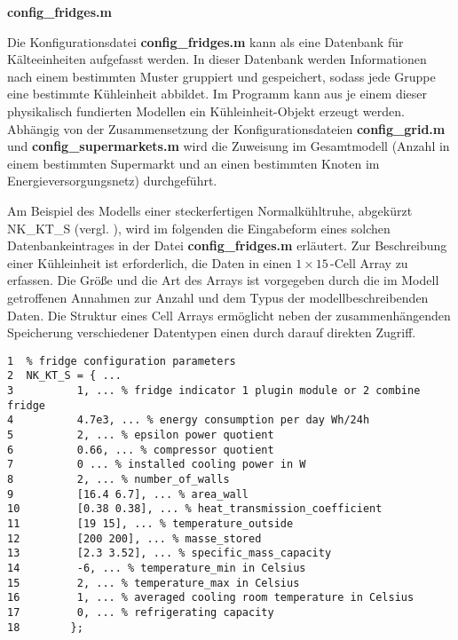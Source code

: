 \vspace{3mm}%
\noindent\textbf{config\_fridges.m}
\vspace{3mm}

Die Konfigurationsdatei \textbf{config\_fridges.m} kann als eine Datenbank für Kälteeinheiten aufgefasst werden. In dieser
Datenbank werden Informationen nach einem bestimmten Muster gruppiert und gespeichert, sodass jede Gruppe eine bestimmte
Kühleinheit abbildet. Im Programm kann aus je einem dieser physikalisch fundierten
Modellen ein Kühleinheit-Objekt erzeugt werden. Abhängig von der Zusammensetzung der
Konfigurationsdateien \textbf{config\_grid.m} und \textbf{config\_supermarkets.m} wird die Zuweisung im Gesamtmodell (Anzahl
in einem bestimmten Supermarkt und an einen bestimmten Knoten im Energieversorgungsnetz) durchgeführt.

Am Beispiel des Modells einer steckerfertigen Normalkühltruhe, abgekürzt NK\_KT\_S (vergl.
), wird im folgenden die Eingabeform eines solchen Datenbankeintrages in der Datei \textbf{config\_fridges.m}
erläutert. Zur Beschreibung einer Kühleinheit ist erforderlich, die Daten in einen $1\times15\,$-Cell Array zu erfassen.  Die
Größe und die Art des Arrays ist vorgegeben durch die im Modell getroffenen Annahmen zur Anzahl und dem
Typus der modellbeschreibenden Daten. Die Struktur eines Cell Arrays ermöglicht neben der zusammenhängenden Speicherung
verschiedener Datentypen einen durch \matlab darauf direkten Zugriff.

\begin{lstlisting}[caption=config\_fridges.m,label={fridge}]
1  % fridge configuration parameters
2  NK_KT_S = { ...
3          1, ... % fridge indicator 1 plugin module or 2 combine fridge
4          4.7e3, ... % energy consumption per day Wh/24h
5          2, ... % epsilon power quotient
6          0.66, ... % compressor quotient
7          0 ... % installed cooling power in W
8          2, ... % number_of_walls
9          [16.4 6.7], ... % area_wall
10         [0.38 0.38], ... % heat_transmission_coefficient
11         [19 15], ... % temperature_outside
12         [200 200], ... % masse_stored
13         [2.3 3.52], ... % specific_mass_capacity
14         -6, ... % temperature_min in Celsius
15         2, ... % temperature_max in Celsius
16         1, ... % averaged cooling room temperature in Celsius
17         0, ... % refrigerating capacity
18        };
\end{lstlisting}

